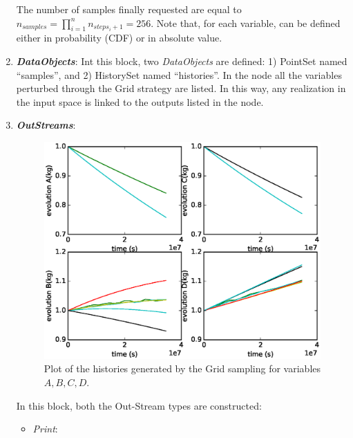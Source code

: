 \begin{enumerate}
  The number of samples finally requested are equal to $n_{samples} = \prod_{i=1}^{n} n_{steps_{i}+1} = 256$.
  Note that, for each variable, can be defined either in probability (CDF) or in absolute value.
   \item \textbf{\textit{DataObjects}}:
  Int this block, two \textit{DataObjects} are defined: 1) PointSet named
  ``samples'', and 2) HistorySet named ``histories''.
  In the  node all the variables
  perturbed through the Grid strategy are listed. In this way, any
  realization in the input space is linked to the outputs listed in  the
   node.
   \item \textbf{\textit{OutStreams}}:
 \begin{figure}[h!]
  \centering
  \includegraphics[scale=0.7]{../../tests/framework/user_guide/ForwardSamplingStrategies/gold/RunDir/Grid/1-historyPlot_line-line-line-line.eps}
  \caption{Plot of the histories generated by the Grid sampling for variables $A,B,C,D$.}
  \label{fig:historiesGridPlotLine}
 \end{figure}
  In this block, both the Out-Stream types are constructed:
  \begin{itemize}
    \item \textit{Print}:

\end{itemize}
\end{enumerate}
